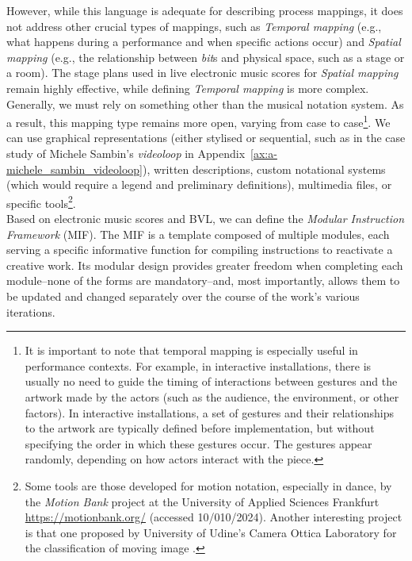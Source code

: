 However, while this language is adequate for describing process mappings, it does not address other crucial types of mappings, such as \textit{Temporal mapping} (e.g., what happens during a performance and when specific actions occur) and \textit{Spatial mapping} (e.g., the relationship between \textit{bit}s and physical space, such as a stage or a room). The stage plans used in live electronic music scores for \textit{Spatial mapping} remain highly effective, while defining \textit{Temporal mapping} is more complex. Generally, we must rely on something other than the musical notation system. As a result, this mapping type remains more open, varying from case to case\footnote{It is important to note that temporal mapping is especially useful in performance contexts. For example, in interactive installations, there is usually no need to guide the timing of interactions between gestures and the artwork made by the actors (such as the audience, the environment, or other factors). In interactive installations, a set of gestures and their relationships to the artwork are typically defined before implementation, but without specifying the order in which these gestures occur. The gestures appear randomly, depending on how actors interact with the piece.}. We can use graphical representations (either stylised or sequential, such as in the case study of Michele Sambin’s \textit{videoloop} in Appendix~\ref{ax:a-michele_sambin_videoloop}), written descriptions, custom notational systems (which would require a legend and preliminary definitions), multimedia files, or specific tools\footnote{Some tools are those developed for motion notation, especially in dance, by the \textit{Motion Bank} project at the University of Applied Sciences Frankfurt \url{https://motionbank.org/} (accessed 10/010/2024). Another interesting project is that one proposed by University of Udine’s Camera Ottica Laboratory for the classification of moving image \cite{costronuovo2024toward}.}.\\
Based on electronic music scores and BVL, we can define the \textit{Modular Instruction Framework} (MIF). The MIF is a template composed of multiple modules, each serving a specific informative function for compiling instructions to reactivate a creative work. Its modular design provides greater freedom when completing each module–none of the forms are mandatory–and, most importantly, allows them to be updated and changed separately over the course of the work’s various iterations.
